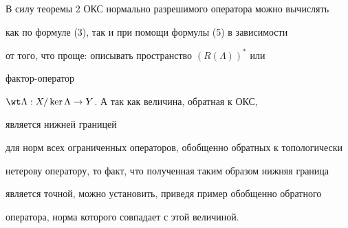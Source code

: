  


В силу теоремы 2\; ОКС нормально разрешимого оператора можно вычислять 


как по формуле (3), так и при помощи формулы (5) в зависимости 


от того, что проще: описывать пространство $(R(\Lambda))^*$ или 


фактор-оператор  


$\wt\Lambda:X/\ker\Lambda\to{}Y$. А так как величина, обратная к ОКС,


является нижней границей 


для норм всех ограниченных операторов, обобщенно обратных к топологически  


нетерову оператору, то факт, что полученная таким образом нижняя граница 


является точной, можно установить, приведя пример обобщенно обратного 


оператора, норма которого совпадает с этой величиной. 


 


